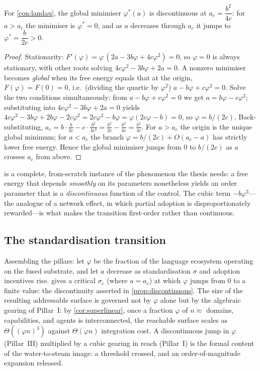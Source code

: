 \begin{proposition}
\label{prop:landau-jump}
For \cref{con:landau}, the global minimiser $\varphi^{*}(a)$ is discontinuous at
$a_c=\dfrac{b^{2}}{4c}$: for $a>a_c$ the minimiser is $\varphi^{*}=0$, and as $a$
decreases through $a_c$ it jumps to $\varphi^{*}=\dfrac{b}{2c}>0$.
\end{proposition}
\begin{proof}
Stationarity: $F'(\varphi)=\varphi\,(2a-3b\varphi+4c\varphi^{2})=0$, so
$\varphi=0$ is always stationary, with other roots solving
$4c\varphi^{2}-3b\varphi+2a=0$. A nonzero minimiser becomes \emph{global} when its
free energy equals that at the origin, $F(\varphi)=F(0)=0$, i.e.\ (dividing the
quartic by $\varphi^{2}$) $a-b\varphi+c\varphi^{2}=0$. Solve the two conditions
simultaneously: from $a-b\varphi+c\varphi^{2}=0$ we get $a=b\varphi-c\varphi^{2}$;
substituting into $4c\varphi^{2}-3b\varphi+2a=0$ yields
$4c\varphi^{2}-3b\varphi+2b\varphi-2c\varphi^{2}=2c\varphi^{2}-b\varphi
=\varphi(2c\varphi-b)=0$, so $\varphi=b/(2c)$. Back-substituting,
$a_c=b\cdot\frac{b}{2c}-c\cdot\frac{b^{2}}{4c^{2}}
=\frac{b^{2}}{2c}-\frac{b^{2}}{4c}=\frac{b^{2}}{4c}$. For $a>a_c$ the origin is the
unique global minimum; for $a<a_c$ the branch $\varphi=b/(2c)+O(a_c-a)$ has strictly
lower free energy. Hence the global minimiser jumps from $0$ to $b/(2c)$ as $a$
crosses $a_c$ from above.
\end{proof}

 is a complete, from-scratch instance of the phenomenon the
thesis needs: a free energy that depends \emph{smoothly} on its parameters
nonetheless yields an order parameter that is a \emph{discontinuous} function of
the control. The cubic term $-b\varphi^{3}$---the analogue of a network effect, in
which partial adoption is disproportionately rewarded---is what makes the
transition first-order rather than continuous.

\subsection{The standardisation transition}
\label{sec:an-standardisation}

Assembling the pillars: let $\varphi$ be the fraction of the language ecosystem
operating on the fused substrate, and let $a$ decrease as standardisation
$\sigma$ and adoption incentives rise.  gives a critical
$\sigma_c$ (where $a=a_c$) at which $\varphi$ jumps from $0$ to a finite value:
the discontinuity asserted in \cref{prop:discontinuous}. The size of the resulting
addressable surface is governed not by $\varphi$ alone but by the algebraic gearing
of Pillar~I: by \cref{cor:superlinear}, once a fraction $\varphi$ of $n{\approx}$
domains, capabilities, and agents is interconnected, the reachable surface scales
as $\Theta((\varphi n)^{3})$ against $\Theta(\varphi n)$ integration cost. A
discontinuous jump in $\varphi$ (Pillar~III) multiplied by a cubic gearing in
reach (Pillar~I) is the formal content of the water-to-steam image: a threshold
crossed, and an order-of-magnitude expansion released.

